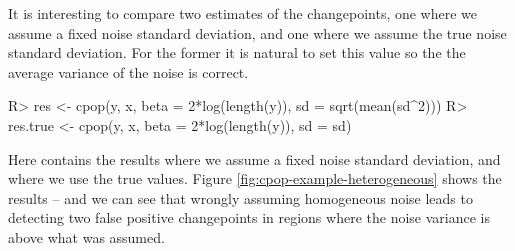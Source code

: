 \documentclass[article]{jss}
\begin{document}
It is interesting to compare two estimates of the changepoints, one where we assume a fixed noise standard deviation, and one where we assume the true noise standard deviation. For the former it is natural to set this value so the the average variance of the noise is correct. 
\begin{CodeChunk}
\begin{CodeInput}
R> res <- cpop(y, x, beta = 2*log(length(y)), sd = sqrt(mean(sd^2)))
R> res.true <- cpop(y, x, beta = 2*log(length(y)), sd = sd)
\end{CodeInput}
\end{CodeChunk}
Here  contains the results where we assume a fixed noise standard deviation, and  where we use the true values. Figure \ref{fig:cpop-example-heterogeneous} shows the results -- and we can see that wrongly assuming homogeneous noise leads to detecting two false positive changepoints in regions where the noise variance is above what was assumed. 

\end{document}
